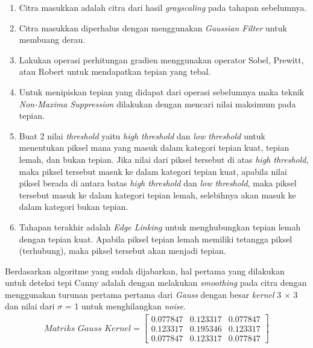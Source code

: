 \begin{enumerate}[leftmargin=16pt]
\item Citra masukkan adalah citra dari hasil \textit{grayscaling} pada tahapan sebelumnya.
\item Citra masukkan diperhalus dengan menggunakan \textit{Gaussian Filter} untuk membuang derau.
\item Lakukan operasi perhitungan gradien menggunakan operator Sobel, Prewitt, atau Robert untuk mendapatkan tepian yang tebal.
\item Untuk menipiskan tepian yang didapat dari operasi sebelumnya maka teknik \textit{Non-Maxima Suppression} dilakukan dengan mencari nilai maksimum pada tepian.
\item Buat 2 nilai \textit{threshold} yaitu \textit{high threshold} dan \textit{low threshold} untuk menentukan piksel mana yang masuk dalam kategori tepian kuat, tepian lemah, dan bukan tepian. Jika nilai dari piksel tersebut di atas \textit{high threshold}, maka piksel tersebut masuk ke dalam kategori tepian kuat, apabila nilai piksel berada di antara batas \textit{high threshold} dan \textit{low threshold}, maka piksel tersebut masuk ke dalam kategori tepian lemah, selebihnya akan masuk ke dalam kategori bukan tepian.
\item Tahapan terakhir adalah \textit{Edge Linking} untuk menghubungkan tepian lemah dengan tepian kuat. Apabila piksel tepian lemah memiliki tetangga piksel (terhubung), maka piksel tersebut akan menjadi tepian.

\end{enumerate}
%

\noindent Berdasarkan algoritme yang sudah dijabarkan, hal pertama yang dilakukan untuk deteksi tepi Canny adalah dengan melakukan \textit{smoothing} pada citra dengan menggunakan turunan pertama pertama dari \textit{Gauss} dengan besar \textit{kernel} 3 $\times$ 3 dan nilai dari $\sigma$ = 1 untuk menghilangkan \textit{noise}.
\begin{gather*}
\textit{Matriks Gauss Kernel}
=
\begin{bmatrix}
0.077847 & 0.123317 & 0.077847 \\
0.123317 & 0.195346	& 0.123317 \\
0.077847 & 0.123317 & 0.077847
\end{bmatrix}
\label{eq:MatriksGaussKernel}
\end{gather*} 


